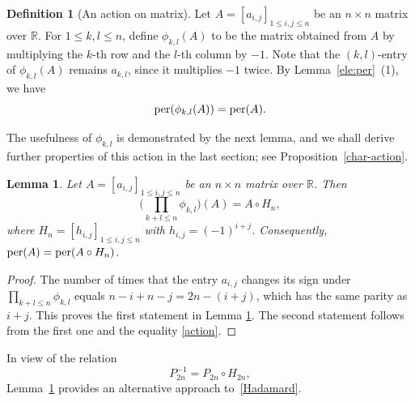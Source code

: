 \documentclass[11pt,reqno]{amsart}
\numberwithin{equation}{section}
\theoremstyle{plain}
\newtheorem{lemma}[theorem]{Lemma}
\theoremstyle{definition}
\newtheorem{Def}[theorem]{Definition}
\def\per{\mathrm{per}}
\def\per{{\rm per}}
\begin{document}
\begin{Def}[An action on matrix]\label{Def:action}
Let $A=[a_{i,j}]_{1\leq i,j\leq n}$ be an $n\times n$ matrix over  $\mathbb{R}$. For $1\leq k,l\leq n$, define  $\phi_{k,l}(A)$ to be the matrix obtained from $A$ by multiplying the $k$-th row and the $l$-th column by $-1$. Note that the $(k,l)$-entry of $\phi_{k,l}(A)$ remains $a_{k,l}$, since it multiplies  $-1$ twice. By Lemma~\ref{ele:per}~(1), we have
\begin{equation}\label{action}
\per(\phi_{k,l}(A))=\per(A).
\end{equation}
\end{Def}
The usefulness of $\phi_{k,l}$ is demonstrated by the next lemma, and we shall derive further properties of this action in the last section; see Proposition~\ref{char-action}.
\begin{lemma}\label{H:sign}
Let $A=[a_{i,j}]_{1\leq i,j\leq n}$ be an $n\times n$ matrix over  $\mathbb{R}$. Then
$$
\biggl(\prod_{k+l\leq n}\phi_{k,l}\biggr)(A)=A\circ H_n,
$$
where $H_n=[h_{i,j}]_{1\leq i,j\leq n}$ with $h_{i,j}=(-1)^{i+j}$. Consequently, $\per(A)=\per(A\circ H_n)$.
\end{lemma}
\begin{proof}
The number of times that the entry $a_{i,j}$ changes its sign under $\prod_{k+l\leq n}\phi_{k,l}$ equals $n-i+n-j=2n-(i+j)$, which has the same parity as $i+j$. This proves the first statement in Lemma \ref{H:sign}. The second statement follows from the first one and the equality \eqref{action}.
\end{proof}

In view of the relation
$$
P^{-1}_{2n}=P_{2n}\circ H_{2n},
$$
 Lemma~\ref{H:sign} provides an alternative approach to~\eqref{Hadamard}.
\end{document}
